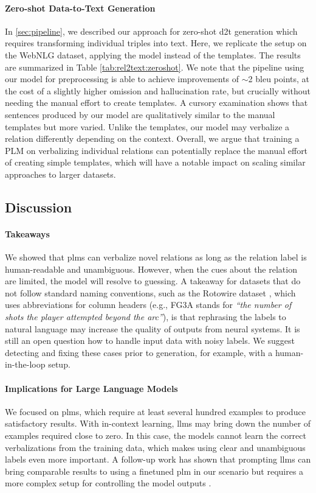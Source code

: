 \paragraph{Zero-shot Data-to-Text Generation} In \autoref{sec:pipeline}, we described our approach for zero-shot \ac{d2t} generation which requires transforming individual triples into text. Here, we replicate the setup on the WebNLG dataset, applying the \BARTr{} model instead of the templates. The results are summarized in Table \ref{tab:rel2text:zeroshot}.  We note that the pipeline using our model for preprocessing is able to achieve improvements of $\sim$2 \acs{bleu} points, at the cost of a slightly higher omission and hallucination rate, but crucially without needing the manual effort to create templates. A cursory examination shows that sentences produced by our model are qualitatively similar to the manual templates but more varied. Unlike the templates, our model may verbalize a relation differently depending on the context.
Overall, we argue that training a PLM on verbalizing individual relations can potentially replace the manual effort of creating simple templates, which will have a notable impact on scaling similar approaches to larger datasets.


\subsection{Discussion}

\paragraph{Takeaways} We showed that \acp{plm} can verbalize novel relations as long as the relation label is human-readable and unambiguous. However, when the cues about the relation are limited, the model will resolve to guessing. A takeaway for datasets that do not follow standard naming conventions, such as the Rotowire dataset \cite{wiseman2017challenges}, which uses abbreviations for column headers (e.g., FG3A stands for \textit{``the number of shots the player attempted beyond the arc''}), is that rephrasing the labels to natural language may increase the quality of outputs from neural systems. It is still an open question how to handle input data with noisy labels. We suggest detecting and fixing these cases prior to generation, for example, with a human-in-the-loop setup.


\paragraph{Implications for Large Language Models} We focused on \acp{plm}, which require at least several hundred examples to produce satisfactory results. With in-context learning, \acp{llm} may bring down the number of examples required close to zero. In this case, the models cannot learn the correct verbalizations from the training data, which makes using clear and unambiguous labels even more important. A follow-up work has shown that prompting \acp{llm} can bring comparable results to using a finetuned \ac{plm} in our scenario but requires a more complex setup for controlling the model outputs \cite{vejvarASPIROAnyshotStructured2023}.

